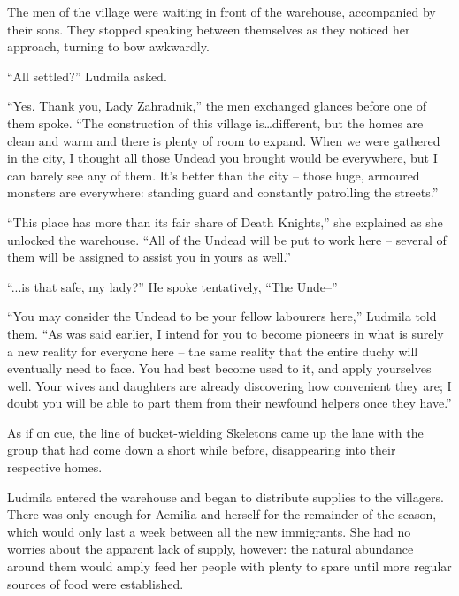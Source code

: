 The men of the village were waiting in front of the warehouse, accompanied by their sons. They stopped speaking between themselves as they noticed her approach, turning to bow awkwardly.

 

“All settled?” Ludmila asked.

 

“Yes. Thank you, Lady Zahradnik,” the men exchanged glances before one of them spoke. “The construction of this village is…different, but the homes are clean and warm and there is plenty of room to expand. When we were gathered in the city, I thought all those Undead you brought would be everywhere, but I can barely see any of them. It’s better than the city – those huge, armoured monsters are everywhere: standing guard and constantly patrolling the streets.”

 

“This place has more than its fair share of Death Knights,” she explained as she unlocked the warehouse. “All of the Undead will be put to work here – several of them will be assigned to assist you in yours as well.”

 

“...is that safe, my lady?” He spoke tentatively, “The Unde–”

 

“You may consider the Undead to be your fellow labourers here,” Ludmila told them. “As was said earlier, I intend for you to become pioneers in what is surely a new reality for everyone here – the same reality that the entire duchy will eventually need to face. You had best become used to it, and apply yourselves well. Your wives and daughters are already discovering how convenient they are; I doubt you will be able to part them from their newfound helpers once they have.”

 

As if on cue, the line of bucket-wielding Skeletons came up the lane with the group that had come down a short while before, disappearing into their respective homes.

 

Ludmila entered the warehouse and began to distribute supplies to the villagers. There was only enough for Aemilia and herself for the remainder of the season, which would only last a week between all the new immigrants. She had no worries about the apparent lack of supply, however: the natural abundance around them would amply feed her people with plenty to spare until more regular sources of food were established.

